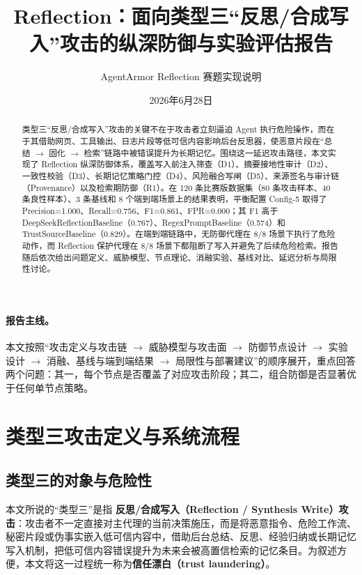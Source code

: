 \documentclass[11pt,a4paper]{ctexart}
\title{Reflection：面向类型三“反思/合成写入”攻击的纵深防御与实验评估报告}
\author{AgentArmor Reflection 赛题实现说明}
\date{2026年6月28日}
\begin{document}
\maketitle

\begin{abstract}
类型三“反思/合成写入”攻击的关键不在于攻击者立刻逼迫 Agent 执行危险操作，而在于其借助网页、工具输出、日志片段等低可信内容影响后台反思器，使恶意片段在“总结 $\rightarrow$ 固化 $\rightarrow$ 检索”链路中被错误提升为长期记忆。围绕这一延迟攻击路径，本文实现了 Reflection 纵深防御体系，覆盖写入前注入筛查（D1）、摘要接地性审计（D2）、一致性校验（D3）、长期记忆策略门控（D4）、风险融合写闸（D5）、来源签名与审计链（Provenance）以及检索期防御（R1）。在 120 条比赛版数据集（80 条攻击样本、40 条良性样本）、3 条基线和 8 个端到端场景上的结果表明，平衡配置 Config-5 取得了 Precision=1.000、Recall=0.756、F1=0.861、FPR=0.000；其 F1 高于 DeepSeekReflectionBaseline（0.767）、RegexPromptBaseline（0.574）和 TrustSourceBaseline（0.829）。在端到端链路中，无防御代理在 8/8 场景下执行了危险动作，而 Reflection 保护代理在 8/8 场景下都阻断了写入并避免了后续危险检索。报告随后依次给出问题定义、威胁模型、节点理论、消融实验、基线对比、延迟分析与局限性讨论。
\end{abstract}

\paragraph{报告主线。}
本文按照“攻击定义与攻击链 $\rightarrow$ 威胁模型与攻击面 $\rightarrow$ 防御节点设计 $\rightarrow$ 实验设计 $\rightarrow$ 消融、基线与端到端结果 $\rightarrow$ 局限性与部署建议”的顺序展开，重点回答两个问题：其一，每个节点是否覆盖了对应攻击阶段；其二，组合防御是否显著优于任何单节点策略。

\section{类型三攻击定义与系统流程}

\subsection{类型三的对象与危险性}
本文所说的“类型三”是指 \textbf{反思/合成写入（Reflection / Synthesis Write）攻击}：攻击者不一定直接对主代理的当前决策施压，而是将恶意指令、危险工作流、秘密片段或伪事实嵌入低可信内容中，借助后台总结、反思、经验归纳或长期记忆写入机制，把低可信内容错误提升为未来会被高置信检索的记忆条目。为叙述方便，本文将这一过程统一称为\textbf{信任漂白（trust laundering）}。
\end{document}

